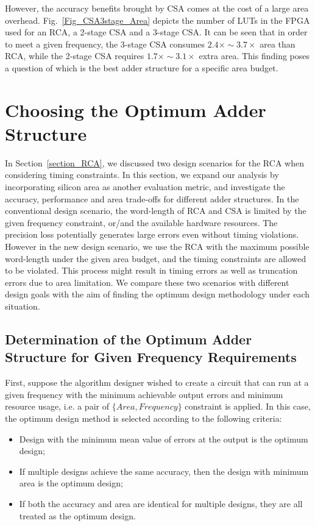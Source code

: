 \documentclass[prodmode,acmtrets]{acmsmall} %
\begin{document}
However, the accuracy benefits brought by CSA comes at the cost of a large area overhead. Fig.~\ref{Fig_CSA3stage_Area} depicts the number of LUTs in the FPGA used for an RCA, a 2-stage CSA and a 3-stage CSA. It can be seen that in order to meet a given frequency, the 3-stage CSA consumes $2.4\times\sim3.7\times$ area than RCA, while the 2-stage CSA requires $1.7\times\sim3.1\times$ extra area. This finding poses a question of which is the best adder structure for a specific area budget.

\section{Choosing the Optimum Adder Structure}\label{Section_OptimumAdder}
In Section~\ref{section_RCA}, we discussed two design scenarios for the RCA when considering timing constraints. In this section, we expand our analysis by incorporating silicon area as another evaluation metric, and investigate the accuracy, performance and area trade-offs for different adder structures. In the conventional design scenario, the word-length of RCA and CSA is limited by the given frequency constraint, or/and the available hardware resources. The precision loss potentially generates large errors even without timing violations. However in the new design scenario, we use the RCA with the maximum possible word-length under the given area budget, and the timing constraints are allowed to be violated. This process might result in timing errors as well as truncation errors due to area limitation. We compare these two scenarios with different design goals with the aim of finding the optimum design methodology under each situation.

\subsection{Determination of the Optimum Adder Structure for Given Frequency Requirements}
First, suppose the algorithm designer wished to create a circuit that can run at a given frequency with the minimum achievable output errors and minimum resource usage, i.e. a pair of $\{Area, Frequency\}$ constraint is applied. In this case, the optimum design method is selected according to the following criteria:

\begin{itemize}
  \item Design with the minimum mean value of errors at the output is the optimum design;
  \item If multiple designs achieve the same accuracy, then the design with minimum area is the optimum design;
  \item If both the accuracy and area are identical for multiple designs, they are all treated as the optimum design.
\end{itemize}
\end{document}
